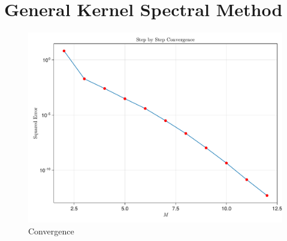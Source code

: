 \chapter{General Kernel Spectral Method}
\label{chap:general-kernel-spectral-method}



\begin{figure}[H]
  \centering
  \label{fig:monomial-basis-convergence}
  \includegraphics[width=0.7\linewidth]{../figures/results/monomial-basis-convergence.pdf}
  \caption{Convergence}
\end{figure}

